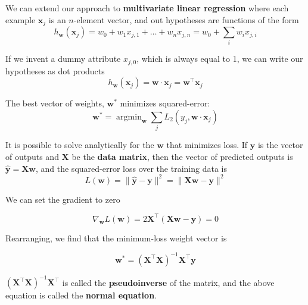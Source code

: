 \documentclass{article}
\DeclareMathOperator*{\argmin}{argmin}
\begin{document}
We can extend our approach to \textbf{multivariate linear regression} where each example
$\textbf{x}_j$ is an $n$-element vector, and out hypotheses are functions of the form
\[
h_{\textbf{w}}(\textbf{x}_j) = w_0 + w_1x_{j,1} + \dots + w_nx_{j,n} = w_0 + \sum_i w_i x_{j,i}
\]

If we invent a dummy attribute $x_{j,0}$, which is always equal to 1, we can write
our hypotheses as dot products
\[
h_{\textbf{w}}(\textbf{x}_j) = \textbf{w} \cdot \textbf{x}_j = \textbf{w}^\top \textbf{x}_j
\]

The best vector of weights, $\textbf{w}^*$ minimizes squared-error:
\[
\textbf{w}^* = \argmin_{\textbf{w}} \sum_j L_2(y_j, \textbf{w} \cdot \textbf{x}_j)
\]

It is possible to solve analytically for the $\textbf{w}$ that minimizes loss. If
$\textbf{y}$ is the vector of outputs and $\textbf{X}$ be the \textbf{data matrix}, then the
vector of predicted outputs is $\mathbf{\hat y} = \textbf{Xw}$, and the
squared-error loss over the training data is
\[
L(\textbf{w}) = \lVert \mathbf{\hat y} - \textbf{y}\rVert^2 = \lVert \textbf{Xw} - \textbf{y}\rVert^2
\]

We can set the gradient to zero

\[
\nabla_{\textbf{w}} L(\textbf{w}) = 2 \textbf{X}^\top (\textbf{Xw} - \textbf{y}) = 0
\]

Rearranging, we find that the minimum-loss weight vector is

\[
\textbf{w}^* = (\textbf{X}^\top \textbf{X})^{-1} \textbf{X}^\top \textbf{y}
\]

$(\textbf{X}^\top \textbf{X})^{-1} \textbf{X}^\top$ is called the \textbf{pseudoinverse}
of the matrix, and the above equation is called the \textbf{normal equation}.
\end{document}
